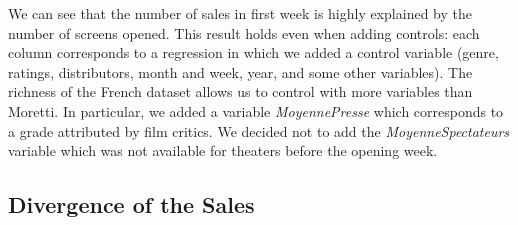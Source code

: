 We can see that the number of sales in first week is highly explained by the number of screens opened. This result holds even when adding controls: each column corresponds to a regression in which we added a control variable (genre, ratings, distributors, month and week, year, and some other variables). The richness of the French dataset allows us to control with more variables than Moretti. In particular, we added a variable \textit{MoyennePresse} which corresponds to a grade attributed by film critics. We decided not to add the \textit{MoyenneSpectateurs} variable which was not available for theaters before the opening week.

\pagebreak
\subsection{Divergence of the Sales}\label{subsec2.2}


